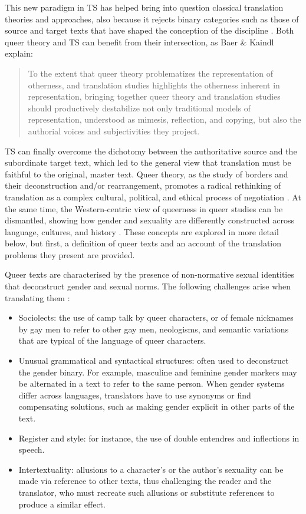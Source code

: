 This new paradigm in TS has helped bring into question classical translation theories and approaches, also because it rejects binary categories such as those of source and target texts that have shaped the conception of the discipline \citep[3]{amenta2020tradurre}. Both queer theory and TS can benefit from their intersection, as Baer \& Kaindl explain:
\begin{quote}
     To the extent that queer theory problematizes the representation of otherness, and translation studies highlights the otherness inherent in representation, bringing together queer theory and translation studies should productively destabilize not only traditional models of representation, understood as mimesis, reflection, and copying, but also the authorial voices and subjectivities they project. \citep[1]{baer2017introduction}
\end{quote}
TS can finally overcome the dichotomy between the authoritative source and the subordinate target text, which led to the general view that translation must be faithful to the original, master text. Queer theory, as the study of borders and their deconstruction and/or rearrangement, promotes a radical rethinking of translation as a complex cultural, political, and ethical process of negotiation \citep{spurlin2014queering}. At the same time, the Western-centric view of queerness in queer studies can be dismantled, showing how gender and sexuality are differently constructed across language, cultures, and history \citep{spurlin2014queering}. These concepts are explored in more detail below, but first, a definition of queer texts and an account of the translation problems they present are provided.

Queer texts are characterised by the presence of non-normative sexual identities that deconstruct gender and sexual norms. The following challenges arise when translating them \citep[5]{amenta2020tradurre}:
\begin{itemize}
\setlength\itemsep{-0.5em}
    \item Sociolects: the use of camp talk by queer characters, or of female nicknames by gay men to refer to other gay men, neologisms, and semantic variations that are typical of the language of queer characters.
    \item Unusual grammatical and syntactical structures: often used to deconstruct the gender binary. For example, masculine and feminine gender markers may be alternated in a text to refer to the same person. When gender systems differ across languages, translators have to use synonyms or find compensating solutions, such as making gender explicit in other parts of the text.
    \item Register and style: for instance, the use of double entendres and inflections in speech.
    \item Intertextuality: allusions to a character's or the author's sexuality can be made via reference to other texts, thus challenging the reader and the translator, who must recreate such allusions or substitute references to produce a similar effect. 
\end{itemize}

